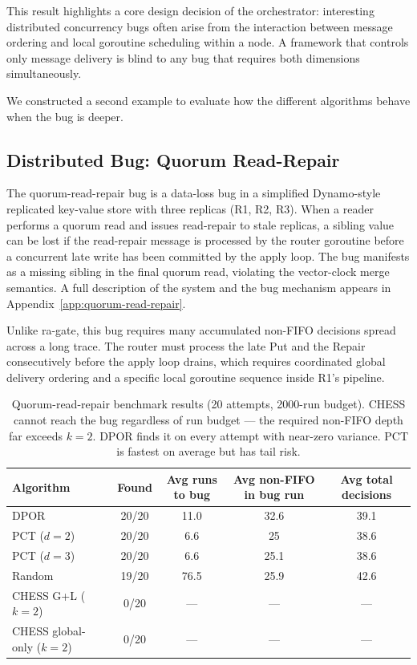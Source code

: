 \documentclass[11pt]{article}
\begin{document}
This result highlights a core design decision of the orchestrator: interesting distributed concurrency bugs often arise from the interaction between message ordering and local goroutine scheduling within a node. A framework that controls only message delivery is blind to any bug that requires both dimensions simultaneously.

We constructed a second example to evaluate how the different algorithms behave when the bug is deeper. 

\subsection{Distributed Bug: Quorum Read-Repair}

The quorum-read-repair bug is a data-loss bug in a simplified Dynamo-style replicated key-value store with three replicas (R1, R2, R3). When a reader performs a quorum read and issues read-repair to stale replicas, a sibling value can be lost if the read-repair message is processed by the router goroutine before a concurrent late write has been committed by the apply loop. The bug manifests as a missing sibling in the final quorum read, violating the vector-clock merge semantics. A full description of the system and the bug mechanism appears in Appendix~\ref{app:quorum-read-repair}.

Unlike ra-gate, this bug requires many accumulated non-FIFO decisions spread across a long trace. The router must process the late Put and the Repair consecutively before the apply loop drains, which requires coordinated global delivery ordering and a specific local goroutine sequence inside R1's pipeline.

\begin{table}[h]
\centering
\caption{Quorum-read-repair benchmark results (20 attempts, 2000-run budget). CHESS cannot reach the bug regardless of run budget --- the required non-FIFO depth far exceeds $k=2$. DPOR finds it on every attempt with near-zero variance. PCT is fastest on average but has tail risk.}
\label{tab:qrr}
\begin{tabular}{@{}lcccc@{}}
\toprule
Algorithm & Found & Avg runs to bug & Avg non-FIFO in bug run & Avg total decisions \\
\midrule
DPOR                  & 20/20 & 11.0 & 32.6  & 39.1  \\
PCT ($d=2$)           & 20/20 & 6.6  & 25   & 38.6  \\
PCT ($d=3$)           & 20/20 & 6.6  & 25.1   & 38.6  \\
Random                & 19/20 & 76.5 & 25.9  & 42.6  \\
CHESS G+L ($k=2$)     & 0/20  & ---  & --- & --- \\
CHESS global-only ($k=2$) & 0/20 & --- & --- & --- \\
\bottomrule
\end{tabular}
\end{table}
\end{document}
